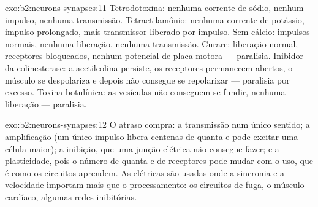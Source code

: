 \begin{solution}{exo:b2:neurons-synapses:11}
Tetrodotoxina: nenhuma corrente de sódio, nenhum impulso, nenhuma
transmissão. Tetraetilamônio: nenhuma corrente de potássio, impulso
prolongado, mais transmissor liberado por impulso. Sem cálcio: impulsos
normais, nenhuma liberação, nenhuma transmissão. Curare: liberação
normal, receptores bloqueados, nenhum potencial de placa motora ---
paralisia. Inibidor da colinesterase: a acetilcolina persiste, os
receptores permanecem abertos, o músculo se despolariza e depois não
consegue se repolarizar --- paralisia por excesso. Toxina botulínica:
as vesículas não conseguem se fundir, nenhuma liberação --- paralisia.
\end{solution}

\begin{solution}{exo:b2:neurons-synapses:12}
O atraso compra: a transmissão num único sentido; a amplificação (um
único impulso libera centenas de quanta e pode excitar uma célula
maior); a inibição, que uma junção elétrica não consegue fazer; e a
plasticidade, pois o número de quanta e de receptores pode mudar com o
uso, que é como os circuitos aprendem. As  elétricas são usadas
onde a sincronia e a velocidade importam mais que o processamento: os
circuitos de fuga, o músculo cardíaco, algumas redes inibitórias.
\end{solution}

